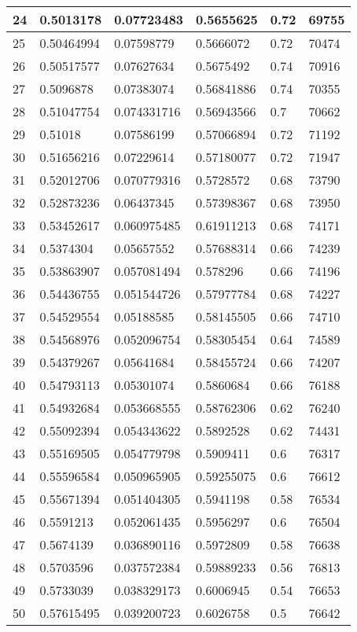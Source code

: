 \begin{longtable}{|l|l|l|l|l|l|}
24 & 0.5013178 & 0.07723483 & 0.5655625 & 0.72 & 69755 \\ \hline 
25 & 0.50464994 & 0.07598779 & 0.5666072 & 0.72 & 70474 \\ \hline 
26 & 0.50517577 & 0.07627634 & 0.5675492 & 0.74 & 70916 \\ \hline 
27 & 0.5096878 & 0.07383074 & 0.56841886 & 0.74 & 70355 \\ \hline 
28 & 0.51047754 & 0.074331716 & 0.56943566 & 0.7 & 70662 \\ \hline 
29 & 0.51018 & 0.07586199 & 0.57066894 & 0.72 & 71192 \\ \hline 
30 & 0.51656216 & 0.07229614 & 0.57180077 & 0.72 & 71947 \\ \hline 
31 & 0.52012706 & 0.070779316 & 0.5728572 & 0.68 & 73790 \\ \hline 
32 & 0.52873236 & 0.06437345 & 0.57398367 & 0.68 & 73950 \\ \hline 
33 & 0.53452617 & 0.060975485 & 0.61911213 & 0.68 & 74171 \\ \hline 
34 & 0.5374304 & 0.05657552 & 0.57688314 & 0.66 & 74239 \\ \hline 
35 & 0.53863907 & 0.057081494 & 0.578296 & 0.66 & 74196 \\ \hline 
36 & 0.54436755 & 0.051544726 & 0.57977784 & 0.68 & 74227 \\ \hline 
37 & 0.54529554 & 0.05188585 & 0.58145505 & 0.66 & 74710 \\ \hline 
38 & 0.54568976 & 0.052096754 & 0.58305454 & 0.64 & 74589 \\ \hline 
39 & 0.54379267 & 0.05641684 & 0.58455724 & 0.66 & 74207 \\ \hline 
40 & 0.54793113 & 0.05301074 & 0.5860684 & 0.66 & 76188 \\ \hline 
41 & 0.54932684 & 0.053668555 & 0.58762306 & 0.62 & 76240 \\ \hline 
42 & 0.55092394 & 0.054343622 & 0.5892528 & 0.62 & 74431 \\ \hline 
43 & 0.55169505 & 0.054779798 & 0.5909411 & 0.6 & 76317 \\ \hline 
44 & 0.55596584 & 0.050965905 & 0.59255075 & 0.6 & 76612 \\ \hline 
45 & 0.55671394 & 0.051404305 & 0.5941198 & 0.58 & 76534 \\ \hline 
46 & 0.5591213 & 0.052061435 & 0.5956297 & 0.6 & 76504 \\ \hline 
47 & 0.5674139 & 0.036890116 & 0.5972809 & 0.58 & 76638 \\ \hline 
48 & 0.5703596 & 0.037572384 & 0.59889233 & 0.56 & 76813 \\ \hline 
49 & 0.5733039 & 0.038329173 & 0.6006945 & 0.54 & 76653 \\ \hline 
50 & 0.57615495 & 0.039200723 & 0.6026758 & 0.5 & 76642 \\ \hline 
\end{longtable}